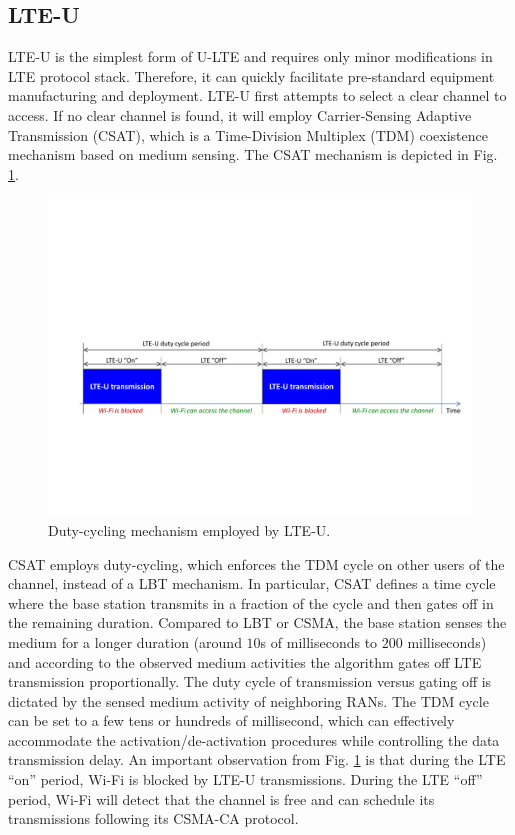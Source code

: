 \subsection{LTE-U}
\mbox{LTE-U} is the simplest form of \mbox{U-LTE} and requires only minor modifications in LTE protocol stack. Therefore, it can quickly facilitate pre-standard equipment manufacturing and deployment. \mbox{LTE-U} first attempts to select a clear channel to access. If no clear channel is found, it will employ Carrier-Sensing Adaptive Transmission (CSAT), which is a Time-Division Multiplex (TDM) coexistence mechanism based on medium sensing. The CSAT mechanism is depicted in Fig. \ref{figs:LTE-U}.
\begin{figure}[!ht]
	\centering
	\includegraphics[width=\textwidth]{figs/LTE-U}
	\caption{Duty-cycling mechanism employed by \mbox{LTE-U}.}
	\label{figs:LTE-U}
\end{figure}
CSAT employs duty-cycling, which enforces the TDM cycle on other users of the channel, instead of a LBT mechanism.  In particular, CSAT defines a time cycle where the base station transmits in a fraction of the cycle and then gates off in the remaining duration. Compared to LBT or CSMA, the base station senses the medium for a longer duration (around $10$s of milliseconds to $200$ milliseconds) and according to the observed medium activities the algorithm gates off LTE transmission proportionally.  The duty cycle of transmission versus gating off is dictated by the sensed medium activity of neighboring RANs. The TDM cycle can be set to a few tens or hundreds of millisecond, which can effectively accommodate the activation/de-activation procedures while controlling the data transmission delay. An important observation from Fig. \ref{figs:LTE-U} is that during the LTE ``on'' period, \mbox{Wi-Fi} is blocked by \mbox{LTE-U} transmissions. During the LTE ``off'' period, \mbox{Wi-Fi} will detect that the channel is free and can schedule its transmissions following its CSMA-CA protocol.

